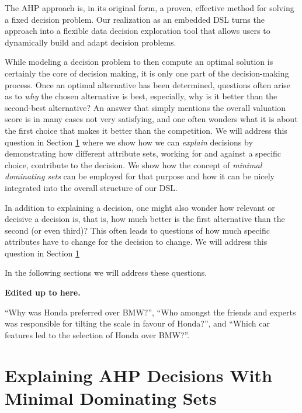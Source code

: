 \documentclass{jfp}
\newcommand{\NOTE}[2][gray]{\smallskip\noindent
  \colorbox{#1!30}{\parbox{.98\linewidth}{{\small\textbf{#2}}}}
}
\newcommand{\prog}[1]{\texttt{#1}}
\begin{document}
%
The AHP approach is, in its original form, a proven, effective method for solving a fixed decision problem. Our realization as an embedded DSL turns the approach into a flexible data decision exploration tool that allows users to dynamically build and adapt decision problems.


While modeling a decision problem to then compute an optimal solution is certainly the core of decision making, it is only one part of the decision-making process. Once an optimal alternative has been determined, questions often arise as to \emph{why} the chosen alternative is best, especially, why is it better than the second-best alternative? 
%
An answer that simply mentions the overall valuation score is in many cases not very satisfying, and one often wonders what it is about the first choice that makes it better than the competition.
%
We will address this question in Section \ref{sec:mds} where we show how we can \emph{explain} decisions by demonstrating how different attribute sets, working for and against a specific choice, contribute to the decision. We show how the concept of \emph{minimal dominating sets} \citep{EKF20padl} can be employed for that purpose and how it can be nicely integrated into the overall structure of our DSL.


In addition to explaining a decision, one might also wonder how relevant or decisive a decision is, that is, how much better is the first alternative than the second (or even third)? This often leads to questions of how much specific attributes have to change for the decision to change. 
%
We will address this question in Section \ref{sec:mds} 

In the following sections we will address these questions.

\NOTE{Edited up to here.}



``Why was Honda preferred over BMW?'', ``Who amongst the friends and experts was responsible for tilting the scale in favour of Honda?'', and ``Which car features led to the selection of Honda over BMW?''. 

 



\section{Explaining AHP Decisions With Minimal Dominating Sets}
\label{sec:mds}
\end{document}
